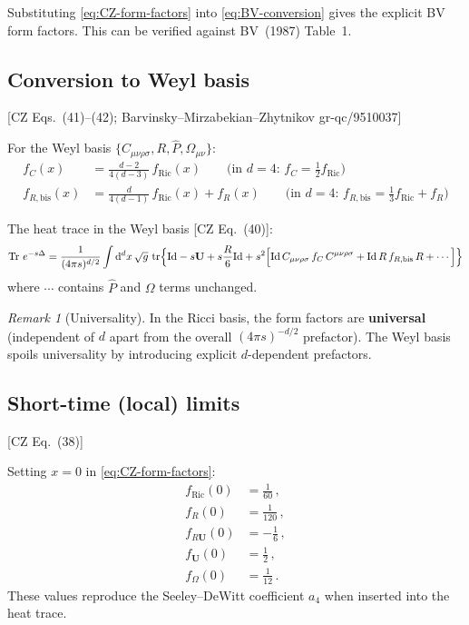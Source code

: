 \documentclass[12pt,a4paper]{article}
\theoremstyle{definition}
\theoremstyle{remark}
\newtheorem{remark}[proposition]{Remark}
\newcommand{\Tr}{\operatorname{Tr}}
\newcommand{\tr}{\operatorname{tr}}
\newcommand{\dd}{\mathrm{d}}
\newcommand{\Id}{\mathrm{Id}}
\newcommand{\fromlit}[1]{\textcolor{blue!70!black}{\textsf{[#1]}}}
\begin{document}
Substituting \eqref{eq:CZ-form-factors} into \eqref{eq:BV-conversion}
gives the explicit BV form factors.  This can be verified against
BV~(1987) Table~1.


\subsection{Conversion to Weyl basis}

\fromlit{CZ Eqs.~(41)--(42); Barvinsky--Mirzabekian--Zhytnikov gr-qc/9510037}

For the Weyl basis $\{C_{\mu\nu\rho\sigma}, R, \hat{P}, \Omega_{\mu\nu}\}$:
\begin{equation}
  \boxed{
  \begin{aligned}
  f_C(x) &= \frac{d-2}{4(d-3)}\,f_{\text{Ric}}(x)
  \qquad\text{(in $d=4$: $f_C = \tfrac{1}{2}f_{\text{Ric}}$)}\\[4pt]
  f_{R,\text{bis}}(x) &= \frac{d}{4(d-1)}\,f_{\text{Ric}}(x) + f_R(x)
  \qquad\text{(in $d=4$: $f_{R,\text{bis}} = \tfrac{1}{3}f_{\text{Ric}} + f_R$)}
  \end{aligned}
  }
  \label{eq:Weyl-conversion}
\end{equation}

The heat trace in the Weyl basis \fromlit{CZ Eq.~(40)}:
\begin{equation}
  \Tr\,e^{-s\Delta}
  = \frac{1}{(4\pi s)^{d/2}}
  \int\dd^d x\,\sqrt{g}\,\tr\Bigl\{
  \Id - s\mathbf{U} + s\frac{R}{6}\Id
  + s^2\Bigl[
  \Id\,C_{\mu\nu\rho\sigma}\,f_C\,C^{\mu\nu\rho\sigma}
  + \Id\,R\,f_{R,\text{bis}}\,R
  + \cdots
  \Bigr]\Bigr\}
  \label{eq:Weyl-heat-trace}
\end{equation}
where $\cdots$ contains $\hat{P}$ and $\Omega$ terms unchanged.

\begin{remark}[Universality]
In the Ricci basis, the form factors are \textbf{universal} (independent
of $d$ apart from the overall $(4\pi s)^{-d/2}$ prefactor).
The Weyl basis spoils universality by introducing explicit $d$-dependent
prefactors.
\end{remark}


\subsection{Short-time (local) limits}

\fromlit{CZ Eq.~(38)}

Setting $x=0$ in \eqref{eq:CZ-form-factors}:
\begin{equation}
  \begin{aligned}
  f_{\text{Ric}}(0) &= \frac{1}{60}\,,\\
  f_R(0) &= \frac{1}{120}\,,\\
  f_{R\mathbf{U}}(0) &= -\frac{1}{6}\,,\\
  f_\mathbf{U}(0) &= \frac{1}{2}\,,\\
  f_\Omega(0) &= \frac{1}{12}\,.
  \end{aligned}
  \label{eq:local-limits}
\end{equation}
These values reproduce the Seeley--DeWitt coefficient $a_4$ when
inserted into the heat trace.
\end{document}
